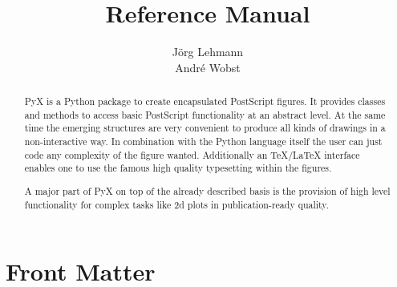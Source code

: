 \documentclass{manual}
\title{\PyX{} Reference Manual}
\author{J\"org Lehmann\\
Andr\'e Wobst}
\date{}
\def\PyX{PyX} %
\begin{document}
\maketitle

\ifhtml %
\chapter*{Front Matter\label{front}}
\fi
\begin{abstract}
\noindent
\PyX{} is a Python package to create encapsulated PostScript figures. It
provides classes and methods to access basic PostScript functionality
at an abstract level. At the same time the emerging structures are
very convenient to produce all kinds of drawings in a non-interactive
way. In combination with the Python language itself the user can just
code any complexity of the figure wanted. Additionally an
\TeX{}/\LaTeX{} interface enables one to use the famous high quality
typesetting within the figures.

A major part of \PyX{} on top of the already described basis is the
provision of high level functionality for complex tasks like 2d plots
in publication-ready quality.
\end{abstract}

\tableofcontents















\appendix







\end{document}
